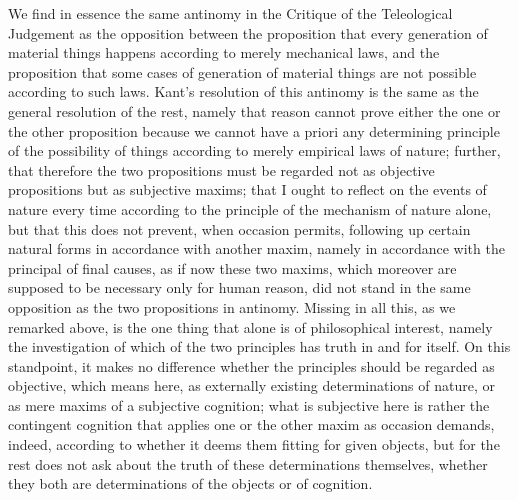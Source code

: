 We find in essence the same antinomy in
the Critique of the Teleological Judgement as
the opposition between the proposition that
every generation of material things happens
according to merely mechanical laws,
and the proposition that some cases
of generation of material things
are not possible according to such laws.
Kant's resolution of this antinomy is the same
as the general resolution of the rest,
namely that reason cannot prove
either the one or the other proposition
because we cannot have a priori
any determining principle of the possibility of things
according to merely empirical laws of nature;
further, that therefore the two propositions must be
regarded not as objective propositions but as subjective maxims;
that I ought to reflect on the events of nature every time
according to the principle of the mechanism of nature alone,
but that this does not prevent, when occasion permits,
following up certain natural forms in accordance with another maxim,
namely in accordance with the principal of final causes,
as if now these two maxims, which moreover are supposed to be
necessary only for human reason,
did not stand in the same opposition as
the two propositions in antinomy.
Missing in all this, as we remarked above,
is the one thing that alone is of philosophical interest,
namely the investigation of which of the two principles
has truth in and for itself.
On this standpoint, it makes no difference
whether the principles should be regarded as objective,
which means here, as externally existing
determinations of nature,
or as mere maxims of a subjective cognition;
what is subjective here is rather the
contingent cognition that applies one or the other maxim
as occasion demands, indeed, according to whether
it deems them fitting for given objects,
but for the rest does not ask about the truth
of these determinations themselves,
whether they both are determinations
of the objects or of cognition.

